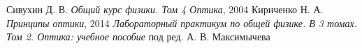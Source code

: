 \documentclass[a4paper]{article}
\begin{document}
\begin{thebibliography}{9}
	 Сивухин Д. В. \emph{Общий курс физики. Том 4 Оптика}, 2004
	 Кириченко Н. А. \emph{Принципы оптики}, 2014
	 \emph{Лабораторный практикум по общей физике. В 3 томах. Том 2. Оптика: учебное пособие} под ред. А. В. Максимычева
\end{thebibliography}
\end{document}

